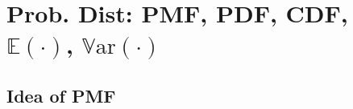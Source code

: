\documentclass[8pt, usepdftitle=false]{beamer}
\begin{document}








\section{Prob. Dist: PMF, PDF, CDF, $\mathbb{E}(\cdot)$, $\mathbb{V}\mathrm{ar}(\cdot)$}
\frame{\sectionpage}

\subsection{Idea of PMF}
\frame{\subsectionpage}
\end{document}
